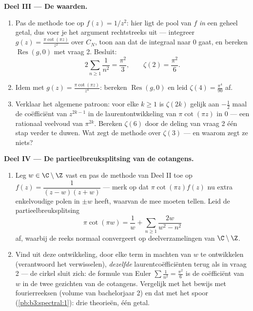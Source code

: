 \begin{problem}
\medskip
\noindent\textbf{Deel III --- De waarden.}
\begin{enumerate}[resume]
  \item Pas de methode toe op $f(z) = 1/z^2$: hier ligt de pool
        van $f$ \emph{in} een geheel getal, dus voer je het
        argument rechtstreeks uit --- integreer $g(z) =
        \frac{\pi\cot(\pi z)}{z^2}$ over $C_N$, toon aan dat de
        integraal naar $0$ gaat, en bereken
        $\operatorname{Res}(g, 0)$ met vraag 2. Besluit:
        \[
        2\sum_{n\geq1}\frac1{n^2} = \frac{\pi^2}{3},
        \qquad \zeta(2) = \frac{\pi^2}6 .
        \]
  \item Idem met $g(z) = \frac{\pi\cot(\pi z)}{z^4}$: bereken
        $\operatorname{Res}(g, 0)$ en leid $\zeta(4) =
        \frac{\pi^4}{90}$ af.
  \item Verklaar het algemene patroon: voor elke $k \geq 1$ is
        $\zeta(2k)$ gelijk aan $-\frac12$ maal de coëfficiënt van
        $z^{2k-1}$ in de laurentontwikkeling van $\pi\cot(\pi z)$
        in $0$ --- een rationaal veelvoud van $\pi^{2k}$. Bereken
        $\zeta(6)$ door de deling van vraag 2 één stap verder te
        duwen. Wat zegt de methode over $\zeta(3)$ --- en waarom
        zegt ze niets?
\end{enumerate}

\medskip
\noindent\textbf{Deel IV --- De partieelbreuksplitsing van de
cotangens.}
\begin{enumerate}[resume]
  \item Leg $w \in \C\setminus\Z$ vast en pas de methode van
        Deel II toe op $f(z) = \dfrac{1}{(z - w)(z + w)}$ ---
        merk op dat $\pi\cot(\pi z)f(z)$ nu extra enkelvoudige
        polen in $\pm w$ heeft, waarvan de  mee moeten
        tellen. Leid de partieelbreuksplitsing
        \[
        \pi\cot(\pi w) = \frac1w +
        \sum_{n\geq1}\frac{2w}{w^2 - n^2}
        \]
        af, waarbij de reeks normaal convergeert op 
        deelverzamelingen van $\C\setminus\Z$.
  \item Vind uit deze ontwikkeling, door elke term in machten van
        $w$ te ontwikkelen (verantwoord het verwisselen),
        \emph{dezelfde} laurentcoëfficiënten terug als in vraag 2
        --- de cirkel sluit zich: de formule van Euler
        $\sum\frac1{n^2} = \frac{\pi^2}6$ is de coëfficiënt van
        $w$ in de twee gezichten van de cotangens. Vergelijk met
        het bewijs met fourierreeksen (volume van bachelorjaar 2)
        en dat met het spoor (\cref{pb:b3:spectral:1}): drie
        theorieën, één getal.
\end{enumerate}


\end{problem}
